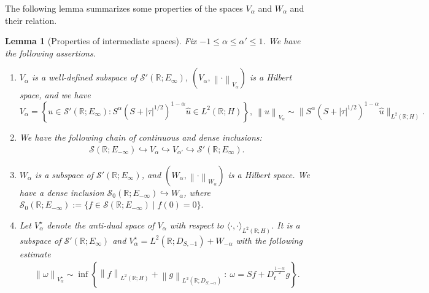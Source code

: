 \documentclass[11pt, letterpaper]{amsart}
\newtheorem{lem}[thm]{Lemma}
\theoremstyle{definition}
\theoremstyle{remark}
\numberwithin{equation}{section}
\begin{document}
The following lemma summarizes some properties of the spaces $V_\alpha$ and $W_\alpha$ and their relation.
\begin{lem}[Properties of intermediate spaces]\label{Spaces V_alpha} Fix  $-1 \leq \alpha \leq \alpha' \leq 1$. We have the following assertions. 
\begin{enumerate}
        \item $V_\alpha $ is a well-defined  subspace of  $\mathcal{S'}(\mathbb{R};E_\infty)$, $\left ( V_\alpha, \left \| \cdot \right \|_{V_\alpha} \right )$ is a Hilbert space, and we have 
                 \begin{equation*}
                     V_\alpha = \left \{ u \in \mathcal{S'}(\mathbb{R};E_\infty) : S^\alpha (S+\left | \tau \right |^{1/2})^{1-\alpha} \hat{u} \in L^2(\mathbb{R};H)\right \}, \ \left \| u \right \|_{V_\alpha} \sim  \| S^\alpha (S+\left | \tau \right |^{1/2})^{1-\alpha}\hat{u}  \|_{L^2(\mathbb{R};H)}.
                 \end{equation*}
        \item We have the following chain of continuous and dense inclusions:
        \begin{align*}
            \mathcal{S}(\mathbb{R};E_{-\infty}) \hookrightarrow V_\alpha \hookrightarrow V_{\alpha'} \hookrightarrow \mathcal{S'}(\mathbb{R};E_{\infty}).
        \end{align*}
         \item { $W_\alpha$ is a subspace of $\mathcal{S'}(\mathbb{R}; E_\infty)$, and $\left( W_\alpha, \left\| \cdot \right\|_{W_\alpha} \right)$ is a Hilbert space. We have a dense inclusion $\mathcal{S}_0(\mathbb{R}; E_{-\infty}) \hookrightarrow W_\alpha$, where
$\mathcal{S}_0(\mathbb{R}; E_{-\infty}) := \{ f \in \mathcal{S}(\mathbb{R}; E_{-\infty}) \mid \hat{f}(0) = 0 \}. $}
        \item Let $V_\alpha^\star$ denote the anti-dual space of $V_\alpha$ with respect to $\langle \cdot , \cdot \rangle_{L^2(\mathbb{R};H)}$. It is a subspace of $\mathcal{S}'(\mathbb{R};E_\infty)$ and  $V_\alpha^\star = L^2(\mathbb{R};D_{S,-1}) + W_{-\alpha}$ with the following estimate
    \begin{align*}     
   \left \| \omega  \right \|_{V_\alpha^\star} \sim \inf  \left\{  \left \| f \right \|_{L^2(\mathbb{R};H)}+\left \| g \right \|_{L^2(\mathbb{R};D_{S,-\alpha})}  \ : \ {\omega=Sf+D_t^{\frac{1-\alpha}{2}}g}\right\}.
\end{align*}
         
    \end{enumerate}
\end{lem}
\end{document}
